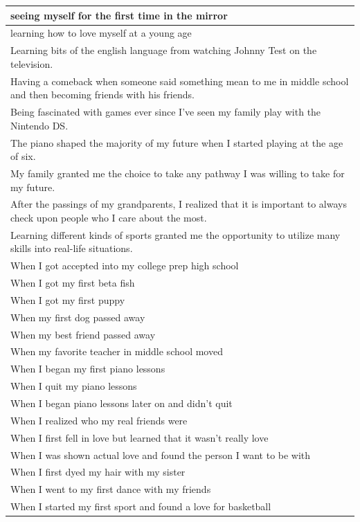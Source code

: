 \documentclass[
  .7em,
  letterpaper,
  DIV=11,
  numbers=noendperiod]{scrartcl}
\begin{document}
\begin{table}
\begin{tabular}{l}
\hline
seeing myself for the first time in the mirror\\
\hline
learning how to love myself at a young age\\
\hline
Learning bits of the english language from watching Johnny Test on the television.\\
\hline
Having a comeback when someone said something mean to me in middle school and then becoming friends with his friends.\\
\hline
Being fascinated with games ever since I've seen my family play with the Nintendo DS.\\
\hline
The piano shaped the majority of my future when I started playing at the age of six.\\
\hline
My family granted me the choice to take any pathway I was willing to take for my future.\\
\hline
After the passings of my grandparents, I realized that it is important to always check upon people who I care about the most.\\
\hline
Learning different kinds of sports granted me the opportunity to utilize many skills into real-life situations.\\
\hline
When I got accepted into my college prep high school\\
\hline
When I got my first beta fish\\
\hline
When I got my first puppy\\
\hline
When my first dog passed away\\
\hline
When my best friend passed away\\
\hline
When my favorite teacher in middle school moved\\
\hline
When I began my first piano lessons\\
\hline
When I quit my piano lessons\\
\hline
When I began piano lessons later on and didn’t quit\\
\hline
When I realized who my real friends were\\
\hline
When I first fell in love but learned that it wasn’t really love\\
\hline
When I was shown actual love and found the person I want to be with\\
\hline
When I first dyed my hair with my sister\\
\hline
When I went to my first dance with my friends\\
\hline
When I started my first sport and found a love for basketball\\

\end{tabular}
\end{table}
\end{document}
